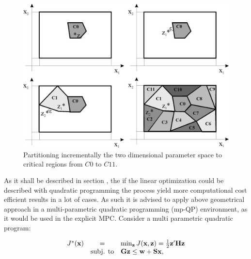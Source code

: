     \begin{figure}[!ht]
        \centering
        \includegraphics[width=.9\textwidth]{EMPC_PNG_Pics/criticalregions.jpg}
        \caption{Partitioning incrementally the two dimensional parameter space to critical regions from $C0$ to $C11$.}
        \label{BASICCSR:fig:Crit}
    \end{figure}

    As it shall be described in section , the if the linear optimization could be described with quadratic programming the process yield more computational cost efficient results in a lot of cases. As such it is advised to apply above geometrical approach in a multi-parametric quadratic programming (mp-QP) environment, as it would be used in the explicit MPC. Consider a multi parametric quadratic program:

    \begin{equation}
    \begin{array}{rcl}
            J^*(\textbf{x})&=&\min_{\textbf{z}}J(\textbf{x},\textbf{z})=\frac{1}{2}\textbf{z}'\textbf{H}\textbf{z}\\
            &\textnormal{subj. to}&\textbf{Gz}\leq\textbf{w}+\textbf{Sx},
        \end{array}
        \label{BASICMPC:equ:MPQP}
    \end{equation}

